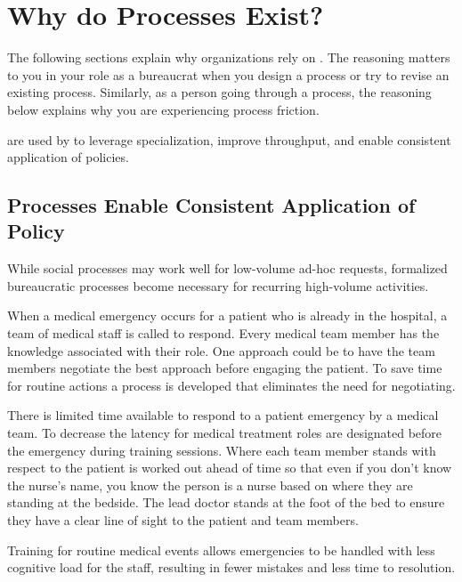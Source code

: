 \section{Why do Processes Exist?\label{sec:why-processes-exist}}


The following sections explain why organizations rely on \iftoggle{glossarysubstitutionworks}{\glspl{process}}{processes}. 
The reasoning matters to you in your role as a bureaucrat when you design 
a process\iftoggle{haspagenumbers}{ (page~\pageref{sec:design-of-processes})}{}
or try to revise an existing process. Similarly, as a person going through a process, the reasoning below explains why you are experiencing \gls{process friction}. 

\iftoggle{glossarysubstitutionworks}{\Glspl{process}}{Processes}
\iftoggle{glossaryinmargin}{\marginpar{[Glossary]}}{}%
are used by 
\iftoggle{glossarysubstitutionworks}{\glspl{bureaucrat}}{bureaucrats}
to leverage specialization, improve throughput, and enable consistent application of policies. 

\subsection*{Processes Enable Consistent Application of Policy}

While social processes may work well for low-volume ad-hoc requests, formalized bureaucratic processes become necessary for recurring high-volume activities.

\begin{mdframed}[frametitle={Emergency Medical Team},frametitlerule=true,frametitlealignment=\centering]
When a medical emergency occurs for a patient who is already in the hospital, a team of medical staff is called to respond. Every medical team member has the knowledge associated with their role. One approach could be to have the team members negotiate the best approach before engaging the patient. To save time for routine actions a process is developed that eliminates the need for negotiating. 

There is limited time available to respond to a patient emergency by a medical team. To decrease the latency for medical treatment roles are designated before the emergency during training sessions. Where each team member stands with respect to the patient is worked out ahead of time so that even if you don't know the nurse's name, you know the person is a nurse based on where they are standing at the bedside. The lead doctor stands at the foot of the bed to ensure they have a clear line of sight to the patient and team members.

Training for routine medical events allows emergencies to be handled with less cognitive load for the staff, resulting in fewer mistakes and less time to resolution. 
\end{mdframed}

